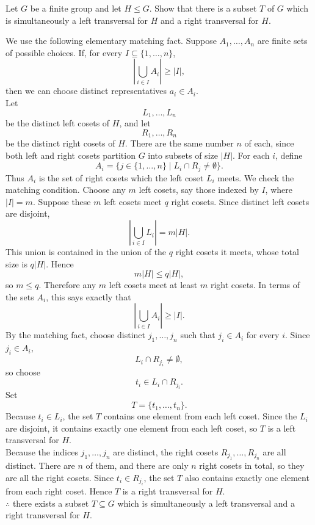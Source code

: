 \documentclass[../Odyssey_Project.tex]{subfiles}
\begin{document}
\begin{exercise}
\label{ex:1.7}
Let $G$ be a finite group and let $H \leq G$. Show that there is a subset $T$ of $G$ which is simultaneously a left transversal for $H$ and a right transversal for $H$.
\end{exercise}
\begin{solution}
We use the following elementary matching fact. Suppose \(A_1,\dots,A_n\) are finite sets of possible choices. If, for every \(I \subseteq \{1,\dots,n\}\),
\[
    \left|\bigcup_{i \in I} A_i\right| \geq |I|,
\]
then we can choose distinct representatives \(a_i \in A_i\). \\
Let
\[
    L_1,\dots,L_n
\]
be the distinct left cosets of \(H\), and let
\[
    R_1,\dots,R_n
\]
be the distinct right cosets of \(H\). There are the same number \(n\) of each, since both left and right cosets partition \(G\) into subsets of size \(|H|\). For each \(i\), define
\[
    A_i = \{j \in \{1,\dots,n\} \mid L_i \cap R_j \ne \emptyset\}.
\]
Thus \(A_i\) is the set of right cosets which the left coset \(L_i\) meets. We check the matching condition. Choose any \(m\) left cosets, say those indexed by \(I\), where \(|I|=m\). Suppose these \(m\) left cosets meet \(q\) right cosets. Since distinct left cosets are disjoint,
\[
    \left|\bigcup_{i \in I} L_i\right| = m|H|.
\]
This union is contained in the union of the \(q\) right cosets it meets, whose total size is \(q|H|\). Hence
\[
    m|H| \leq q|H|,
\]
so \(m \leq q\). Therefore any \(m\) left cosets meet at least \(m\) right cosets. In terms of the sets \(A_i\), this says exactly that
\[
    \left|\bigcup_{i \in I} A_i\right| \geq |I|.
\]
By the matching fact, choose distinct \(j_1,\dots,j_n\) such that \(j_i \in A_i\) for every \(i\). Since \(j_i \in A_i\),
\[
    L_i \cap R_{j_i} \ne \emptyset,
\]
so choose
\[
    t_i \in L_i \cap R_{j_i}.
\]
Set
\[
    T = \{t_1,\dots,t_n\}.
\]
Because \(t_i \in L_i\), the set \(T\) contains one element from each left coset. Since the \(L_i\) are disjoint, it contains exactly one element from each left coset, so \(T\) is a left transversal for \(H\). \\
Because the indices \(j_1,\dots,j_n\) are distinct, the right cosets \(R_{j_1},\dots,R_{j_n}\) are all distinct. There are \(n\) of them, and there are only \(n\) right cosets in total, so they are all the right cosets. Since \(t_i \in R_{j_i}\), the set \(T\) also contains exactly one element from each right coset. Hence \(T\) is a right transversal for \(H\). \\
\(\therefore\) there exists a subset \(T \subseteq G\) which is simultaneously a left transversal and a right transversal for \(H\).
\end{solution}
\end{document}
